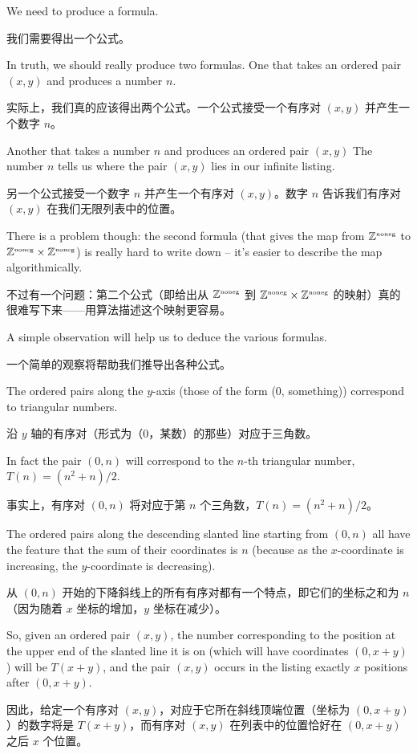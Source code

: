 We need to produce a formula.

我们需要得出一个公式。

In truth, we should really produce two
formulas.  One that takes an ordered pair $(x, y)$ and produces a number $n$.

实际上，我们真的应该得出两个公式。一个公式接受一个有序对 $(x, y)$ 并产生一个数字 $n$。

Another that takes a number $n$ and produces an ordered pair $(x, y)$ The
number $n$ tells us where the pair $(x, y)$ lies in our infinite listing.

另一个公式接受一个数字 $n$ 并产生一个有序对 $(x, y)$。数字 $n$ 告诉我们有序对 $(x, y)$ 在我们无限列表中的位置。

There is a
problem though: the second formula (that gives the map from ${\mathbb Z}^{\mbox{\tiny noneg}}$
to ${\mathbb Z}^{\mbox{\tiny noneg}} \times {\mathbb Z}^{\mbox{\tiny noneg}}$)
is really hard to write down -- it's easier to describe the map
algorithmically.

不过有一个问题：第二个公式（即给出从 ${\mathbb Z}^{\mbox{\tiny noneg}}$ 到 ${\mathbb Z}^{\mbox{\tiny noneg}} \times {\mathbb Z}^{\mbox{\tiny noneg}}$ 的映射）真的很难写下来——用算法描述这个映射更容易。

A simple observation will help us to deduce the various formulas.

一个简单的观察将帮助我们推导出各种公式。

The
ordered pairs along the $y$-axis (those of the form (0, something)) correspond
to triangular numbers.

沿 $y$ 轴的有序对（形式为（0，某数）的那些）对应于三角数。

In fact the pair $(0, n)$ will correspond to the $n$-th triangular
number, $T(n) = (n^2 + n)/2$.

事实上，有序对 $(0, n)$ 将对应于第 $n$ 个三角数，$T(n) = (n^2 + n)/2$。

The ordered pairs along the descending
slanted line starting from $(0, n)$  all have the feature that the sum of their
coordinates is $n$ (because as the $x$-coordinate is increasing, the
$y$-coordinate
is decreasing).

从 $(0, n)$ 开始的下降斜线上的所有有序对都有一个特点，即它们的坐标之和为 $n$（因为随着 $x$ 坐标的增加，$y$ 坐标在减少）。

So, given an ordered pair $(x, y)$, the number corresponding
to the position at the upper end of the slanted line it is on (which will have
coordinates $(0, x+y)$) will be $T(x+y)$, and the pair $(x, y)$ occurs in the listing exactly $x$ positions after $(0, x + y)$.

因此，给定一个有序对 $(x, y)$，对应于它所在斜线顶端位置（坐标为 $(0, x+y)$）的数字将是 $T(x+y)$，而有序对 $(x, y)$ 在列表中的位置恰好在 $(0, x + y)$ 之后 $x$ 个位置。

